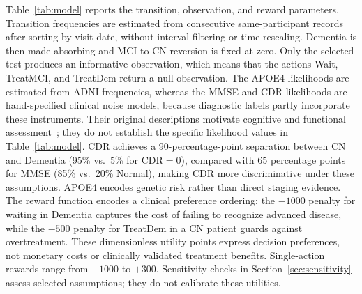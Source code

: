 \documentclass[conference,a4paper]{IEEEtran}
\begin{document}
Table~\ref{tab:model} reports the transition, observation, and reward
parameters. Transition frequencies are estimated from consecutive
same-participant records after sorting by visit date, without
interval filtering or time rescaling. Dementia is then made absorbing
and MCI-to-CN reversion is fixed at zero. Only the selected test produces
an informative observation, which means that the actions Wait, TreatMCI,
and TreatDem return a null observation. The APOE4 likelihoods are estimated from ADNI frequencies,
whereas the MMSE and CDR likelihoods are hand-specified clinical noise
models, because diagnostic labels partly incorporate these instruments.
Their original descriptions motivate cognitive and functional
assessment~\cite{folstein1975mmse,hughes1982cdr}; they do not establish
the specific likelihood values in Table~\ref{tab:model}. CDR achieves a 90-percentage-point
separation between CN and Dementia (95\% vs.\ 5\% for CDR$=0$), compared
with 65 percentage points for MMSE (85\% vs.\ 20\% Normal), making CDR
more discriminative under these assumptions. APOE4 encodes genetic risk rather than
direct staging evidence. The reward function encodes a clinical preference
ordering: the $-1000$ penalty for waiting in Dementia captures the cost of
failing to recognize advanced disease, while the $-500$ penalty for TreatDem
in a CN patient guards against overtreatment. These dimensionless utility
points express decision preferences, not monetary costs or
clinically validated treatment benefits. Single-action rewards range
from $-1000$ to $+300$. Sensitivity checks in Section~\ref{sec:sensitivity}
assess selected assumptions; they do not calibrate these utilities.
\end{document}
